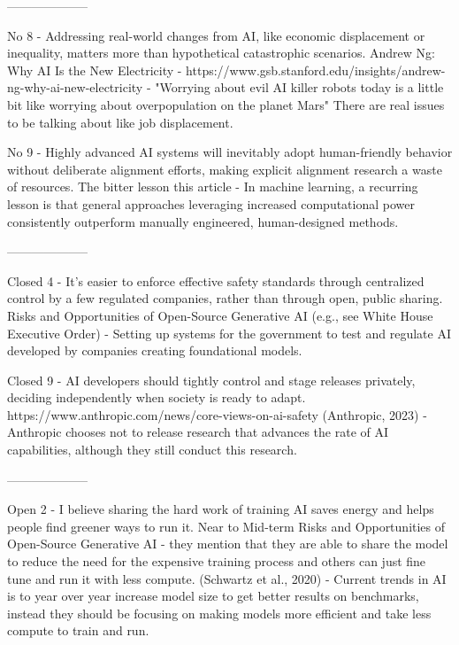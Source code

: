 --------------------

No 8 - Addressing real-world changes from AI, like economic displacement or inequality, matters more than hypothetical catastrophic scenarios.
Andrew Ng: Why AI Is the New Electricity - https://www.gsb.stanford.edu/insights/andrew-ng-why-ai-new-electricity
\citep{ng_andrew_2017} - "Worrying about evil AI killer robots today is a little bit like worrying about overpopulation on the planet Mars" There are real issues to be talking about like job displacement.

No 9 - Highly advanced AI systems will inevitably adopt human-friendly behavior without deliberate alignment efforts, making explicit alignment research a waste of resources.
The bitter lesson
this article
\citep{sutton_bitter_2019} - In machine learning, a recurring lesson is that general approaches leveraging increased computational power consistently outperform manually engineered, human-designed methods.

--------------------

Closed 4 - It's easier to enforce effective safety standards through centralized control by a few regulated companies, rather than through open, public sharing.
Risks and Opportunities of Open-Source Generative AI
(e.g., see White House Executive Order)
\citep{the_white_house_fact_2023} - Setting up systems for the government to test and regulate AI developed by companies creating foundational models.

Closed 9 - AI developers should tightly control and stage releases privately, deciding independently when society is ready to adapt.
https://www.anthropic.com/news/core-views-on-ai-safety
(Anthropic, 2023)
\citep{anthropic_core_2023} - Anthropic chooses not to release research that advances the rate of AI capabilities, although they still conduct this research.

--------------------

Open 2 - I believe sharing the hard work of training AI saves energy and helps people find greener ways to run it.
Near to Mid-term Risks and Opportunities of Open-Source Generative AI
\citep{touvron_llama_2023} - they mention that they are able to share the model to reduce the need for the expensive training process and others can just fine tune and run it with less compute.
(Schwartz et al., 2020)
\citep{schwartz_green_2019} - Current trends in AI is to year over year increase model size to get better results on benchmarks, instead they should be focusing on making models more efficient and take less compute to train and run.
